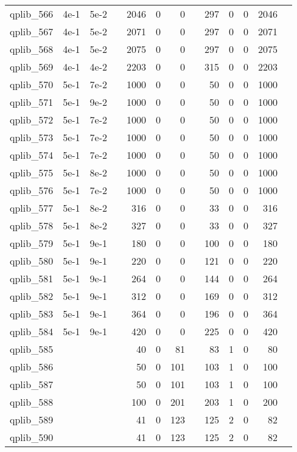 \begin{table}
\begin{tabular}{lrrrrrrrrrrrr}
qplib\_566	&	4e-1	&	5e-2	&	&	2046	&	0	&	0	&	&	297	&	0	&	0	&	2046	\\
qplib\_567	&	4e-1	&	5e-2	&	&	2071	&	0	&	0	&	&	297	&	0	&	0	&	2071	\\
qplib\_568	&	4e-1	&	5e-2	&	&	2075	&	0	&	0	&	&	297	&	0	&	0	&	2075	\\
qplib\_569	&	4e-1	&	4e-2	&	&	2203	&	0	&	0	&	&	315	&	0	&	0	&	2203	\\
qplib\_570	&	5e-1	&	7e-2	&	&	1000	&	0	&	0	&	&	50	&	0	&	0	&	1000	\\
qplib\_571	&	5e-1	&	9e-2	&	&	1000	&	0	&	0	&	&	50	&	0	&	0	&	1000	\\
qplib\_572	&	5e-1	&	7e-2	&	&	1000	&	0	&	0	&	&	50	&	0	&	0	&	1000	\\
qplib\_573	&	5e-1	&	7e-2	&	&	1000	&	0	&	0	&	&	50	&	0	&	0	&	1000	\\
qplib\_574	&	5e-1	&	7e-2	&	&	1000	&	0	&	0	&	&	50	&	0	&	0	&	1000	\\
qplib\_575	&	5e-1	&	8e-2	&	&	1000	&	0	&	0	&	&	50	&	0	&	0	&	1000	\\
qplib\_576	&	5e-1	&	7e-2	&	&	1000	&	0	&	0	&	&	50	&	0	&	0	&	1000	\\
qplib\_577	&	5e-1	&	8e-2	&	&	316	&	0	&	0	&	&	33	&	0	&	0	&	316	\\
qplib\_578	&	5e-1	&	8e-2	&	&	327	&	0	&	0	&	&	33	&	0	&	0	&	327	\\
qplib\_579	&	5e-1	&	9e-1	&	&	180	&	0	&	0	&	&	100	&	0	&	0	&	180	\\
qplib\_580	&	5e-1	&	9e-1	&	&	220	&	0	&	0	&	&	121	&	0	&	0	&	220	\\
qplib\_581	&	5e-1	&	9e-1	&	&	264	&	0	&	0	&	&	144	&	0	&	0	&	264	\\
qplib\_582	&	5e-1	&	9e-1	&	&	312	&	0	&	0	&	&	169	&	0	&	0	&	312	\\
qplib\_583	&	5e-1	&	9e-1	&	&	364	&	0	&	0	&	&	196	&	0	&	0	&	364	\\
qplib\_584	&	5e-1	&	9e-1	&	&	420	&	0	&	0	&	&	225	&	0	&	0	&	420	\\
qplib\_585	&		&		&	&	40	&	0	&	81	&	&	83	&	1	&	0	&	80	\\
qplib\_586	&		&		&	&	50	&	0	&	101	&	&	103	&	1	&	0	&	100	\\
qplib\_587	&		&		&	&	50	&	0	&	101	&	&	103	&	1	&	0	&	100	\\
qplib\_588	&		&		&	&	100	&	0	&	201	&	&	203	&	1	&	0	&	200	\\
qplib\_589	&		&		&	&	41	&	0	&	123	&	&	125	&	2	&	0	&	82	\\
qplib\_590	&		&		&	&	41	&	0	&	123	&	&	125	&	2	&	0	&	82	\\

\end{tabular}
\end{table}
